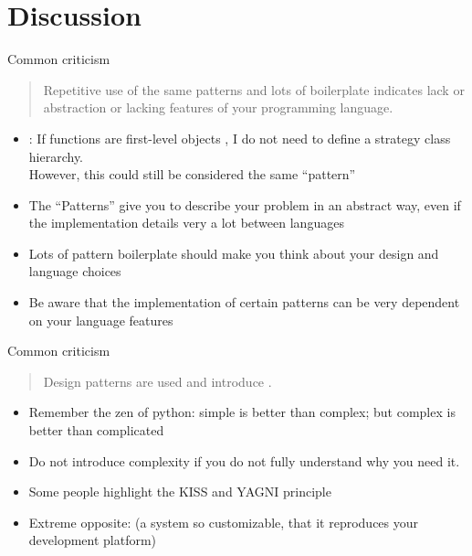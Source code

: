 \section{Discussion}


\begin{frame}{Common criticism}
	\begin{quote}
		Repetitive use of the same patterns and lots of boilerplate indicates lack or abstraction or lacking features of your programming language.
	\end{quote}
	\begin{itemize}
		\item {}: If functions are first-level objects , I do not need to define a strategy class hierarchy. \\
		However, this could still be considered the same \enquote{pattern} 
		\item The \enquote{Patterns} give you  to describe your problem in an abstract way, even if the implementation details very a lot between languages
		\item Lots of pattern boilerplate should make you think about your design and language choices
		\item Be aware that the implementation of  certain patterns can be very dependent on your language features 
	\end{itemize}	
\end{frame}

\begin{frame}{Common criticism}
	\begin{quote}
		Design patterns are used  and introduce .
	\end{quote}
	\begin{itemize}
		\item 
		Remember the zen of python: simple is better than complex; but complex is better than complicated
		\item
		Do not introduce complexity  if you do not fully understand why you need it. 
		\item 
		Some people highlight the KISS  and YAGNI  principle
		\item 
		Extreme opposite:  (a system so customizable, that it reproduces your development platform)
	\end{itemize}
\end{frame}


